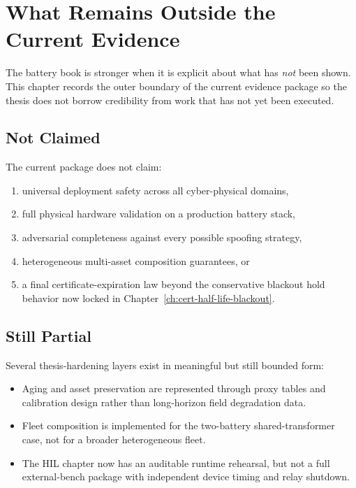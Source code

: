 \chapter{What Remains Outside the Current Evidence}
\label{ch:outside-current-evidence}

The battery book is stronger when it is explicit about what has \emph{not}
been shown.  This chapter records the outer boundary of the current evidence
package so the thesis does not borrow credibility from work that has not yet
been executed.

\section{Not Claimed}

The current package does not claim:

\begin{enumerate}
  \item universal deployment safety across all cyber-physical domains,
  \item full physical hardware validation on a production battery stack,
  \item adversarial completeness against every possible spoofing strategy,
  \item heterogeneous multi-asset composition guarantees, or
  \item a final certificate-expiration law beyond the conservative blackout
    hold behavior now locked in Chapter~\ref{ch:cert-half-life-blackout}.
\end{enumerate}

\section{Still Partial}

Several thesis-hardening layers exist in meaningful but still bounded form:

\begin{itemize}
  \item Aging and asset preservation are represented through proxy tables and
    calibration design rather than long-horizon field degradation data.
  \item Fleet composition is implemented for the two-battery shared-transformer
    case, not for a broader heterogeneous fleet.
  \item The HIL chapter now has an auditable runtime rehearsal, but not a full
    external-bench package with independent device timing and relay shutdown.
\end{itemize}

